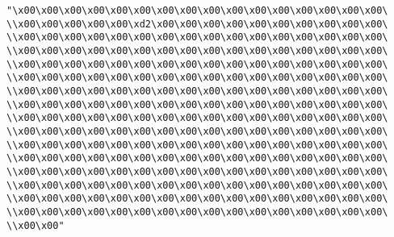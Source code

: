 \verb|"\x00\x00\x00\x00\x00\x00\x00\x00\x00\x00\x00\x00\x00\x00\x00\x00\|\newline
\verb|\\x00\x00\x00\x00\x00\xd2\x00\x00\x00\x00\x00\x00\x00\x00\x00\x00\|\newline
\verb|\\x00\x00\x00\x00\x00\x00\x00\x00\x00\x00\x00\x00\x00\x00\x00\x00\|\newline
\verb|\\x00\x00\x00\x00\x00\x00\x00\x00\x00\x00\x00\x00\x00\x00\x00\x00\|\newline
\verb|\\x00\x00\x00\x00\x00\x00\x00\x00\x00\x00\x00\x00\x00\x00\x00\x00\|\newline
\verb|\\x00\x00\x00\x00\x00\x00\x00\x00\x00\x00\x00\x00\x00\x00\x00\x00\|\newline
\verb|\\x00\x00\x00\x00\x00\x00\x00\x00\x00\x00\x00\x00\x00\x00\x00\x00\|\newline
\verb|\\x00\x00\x00\x00\x00\x00\x00\x00\x00\x00\x00\x00\x00\x00\x00\x00\|\newline
\verb|\\x00\x00\x00\x00\x00\x00\x00\x00\x00\x00\x00\x00\x00\x00\x00\x00\|\newline
\verb|\\x00\x00\x00\x00\x00\x00\x00\x00\x00\x00\x00\x00\x00\x00\x00\x00\|\newline
\verb|\\x00\x00\x00\x00\x00\x00\x00\x00\x00\x00\x00\x00\x00\x00\x00\x00\|\newline
\verb|\\x00\x00\x00\x00\x00\x00\x00\x00\x00\x00\x00\x00\x00\x00\x00\x00\|\newline
\verb|\\x00\x00\x00\x00\x00\x00\x00\x00\x00\x00\x00\x00\x00\x00\x00\x00\|\newline
\verb|\\x00\x00\x00\x00\x00\x00\x00\x00\x00\x00\x00\x00\x00\x00\x00\x00\|\newline
\verb|\\x00\x00\x00\x00\x00\x00\x00\x00\x00\x00\x00\x00\x00\x00\x00\x00\|\newline
\verb|\\x00\x00\x00\x00\x00\x00\x00\x00\x00\x00\x00\x00\x00\x00\x00\x00\|\newline
\verb|\\x00\x00"|\newline
